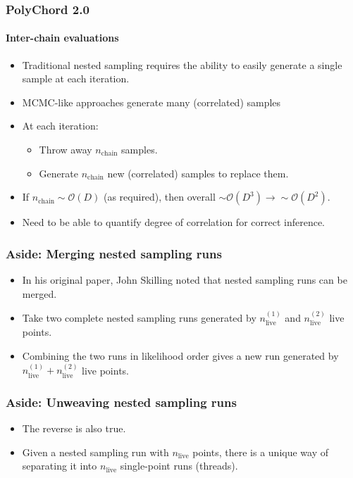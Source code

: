 \documentclass[%
]{beamer}
\newcommand{\nlive}{n_\mathrm{live}}
\begin{document}
\begin{frame}
  \frametitle{PolyChord 2.0}
  \framesubtitle{Inter-chain evaluations}
  \begin{itemize}
    \pause\item Traditional nested sampling requires the ability to easily generate a single sample at each iteration.
    \pause\item MCMC-like approaches generate many (correlated) samples
    \pause\item At each iteration:
      \begin{itemize}
        \pause\item Throw away $n_\mathrm{chain}$ samples.
        \pause\item Generate $n_\mathrm{chain}$ new (correlated) samples to replace them.
      \end{itemize}
    \pause\item If $n_\mathrm{chain}\sim\mathcal{O}(D)$ (as required), then overall $\sim\mathcal{O}(D^3)\to\sim\mathcal{O}(D^2)$.
    \pause\item Need to be able to quantify degree of correlation for correct inference.
  \end{itemize}
\end{frame}

\begin{frame}
  \frametitle{Aside: Merging nested sampling runs}

  \begin{itemize}
    \pause\item In his original paper, John Skilling noted that nested sampling runs can be merged.
    \pause\item Take two complete nested sampling runs generated by $\nlive^{(1)}$ and $\nlive^{(2)}$ live points.
    \pause\item Combining the two runs in likelihood order gives a new run generated by $\nlive^{(1)}+\nlive^{(2)}$ live points. 
  \end{itemize}

\end{frame}

\begin{frame}
  \frametitle{Aside: Unweaving nested sampling runs}

  \begin{itemize}
    \pause\item The reverse is also true.
    \pause\item Given a nested sampling run with $\nlive$ points, there is a unique way of separating it into $\nlive$ single-point runs (threads).
  \end{itemize}

\end{frame}
\end{document}
